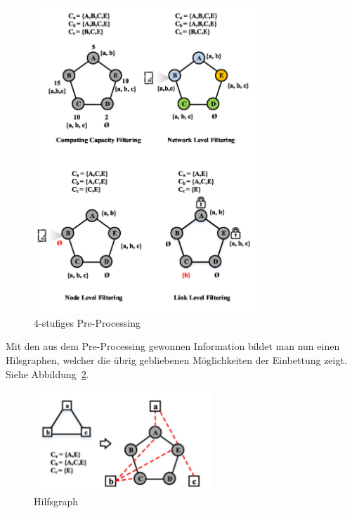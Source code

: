 \documentclass{lni}
\begin{document}
\begin{figure}[htb]
\begin{center}
\includegraphics[width=0.75\textwidth]{pre-processing.pdf}\newline
\caption{\label{graph8}4-stufiges Pre-Processing\cite{wang2016towards}}
\end{center}
\end{figure}

Mit den aus dem Pre-Processing gewonnen Information bildet man nun einen Hilsgraphen, welcher die übrig gebliebenen Möglichkeiten der Einbettung zeigt. Siehe Abbildung~\ref{graph9}. \newline

\begin{figure}[htb]
\begin{center}
	\includegraphics[width=0.6\textwidth]{auxgraph.pdf}\newline 
	\caption{\label{graph9}Hilfsgraph\cite{wang2016towards}}
\end{center}
\end{figure}
\end{document}
